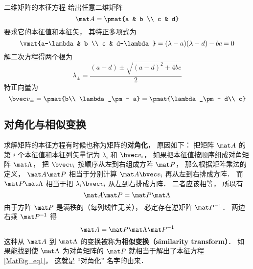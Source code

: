 \begin{example}{二维矩阵的本征方程}
给出任意二维矩阵
\begin{equation}
\mat A = \pmat{a & b \\ c & d}
\end{equation}
要求它的本征值和本征矢， 其特正多项式为
\begin{equation}
\vmat{a-\lambda & b \\ c & d-\lambda} = (\lambda-a)(\lambda-d) - bc = 0
\end{equation}
解二次方程得两个根为
\begin{equation}
\lambda_\pm = \frac{(a + d) \pm \sqrt{(a-d)^2 + 4bc}}{2}
\end{equation}
特正向量为
\begin{equation}
\bvec v_\pm = \pmat{b\\ \lambda_\pm - a} = \pmat{\lambda_\pm - d\\ c}
\end{equation}
\end{example}

\subsection{对角化与相似变换}
求解矩阵的本征方程有时候也称为矩阵的\textbf{对角化}， 原因如下： 把矩阵 $\mat A$ 的第 $i$ 个本征值和本征列矢量记为 $\lambda_i$ 和 $\bvec v_i$， 如果把本征值按顺序组成对角矩阵 $\mat \Lambda$， 把 $\bvec v_i$ 按顺序从左到右组成方阵 $\mat P$， 那么根据矩阵乘法的定义， $\mat A \mat P$ 相当于分别计算 $\mat A\bvec v_i$ 再从左到右排成方阵． 而 $\mat P\mat\Lambda$ 相当于把 $\lambda_i\bvec v_i$ 从左到右排成方阵． 二者应该相等， 所以有
\begin{equation}
\mat A \mat P = \mat P\mat\Lambda
\end{equation}
由于方阵 $\mat P$ 是满秩的（每列线性无关）， 必定存在逆矩阵%
$\mat P^{-1}$． 两边右乘 $\mat P^{-1}$ 得
\begin{equation}\label{MatEig_eq3}
\mat A = \mat P\mat\Lambda\mat P^{-1}
\end{equation}
这种从 $\mat A$ 到 $\mat\Lambda$ 的变换被称为\textbf{相似变换（similarity transform）}． 如果能找到使 $\mat\Lambda$ 为对角矩阵的 $\mat P$ 就相当于解出了本征方程\autoref{MatEig_eq1}， 这就是 “对角化” 名字的由来．
